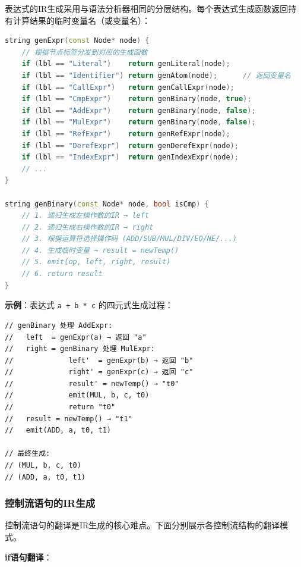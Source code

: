 \documentclass[12pt,a4paper]{ctexart}
\begin{document}
表达式的IR生成采用与语法分析器相同的分层结构。每个表达式生成函数返回持有计算结果的临时变量名（或变量名）：

\begin{lstlisting}[language=C++, caption={表达式IR生成函数}]
string genExpr(const Node* node) {
    // 根据节点标签分发到对应的生成函数
    if (lbl == "Literal")    return genLiteral(node);
    if (lbl == "Identifier") return genAtom(node);      // 返回变量名
    if (lbl == "CallExpr")   return genCallExpr(node);
    if (lbl == "CmpExpr")    return genBinary(node, true);
    if (lbl == "AddExpr")    return genBinary(node, false);
    if (lbl == "MulExpr")    return genBinary(node, false);
    if (lbl == "RefExpr")    return genRefExpr(node);
    if (lbl == "DerefExpr")  return genDerefExpr(node);
    if (lbl == "IndexExpr")  return genIndexExpr(node);
    // ...
}

string genBinary(const Node* node, bool isCmp) {
    // 1. 递归生成左操作数的IR → left
    // 2. 递归生成右操作数的IR → right
    // 3. 根据运算符选择操作码 (ADD/SUB/MUL/DIV/EQ/NE/...)
    // 4. 生成临时变量 → result = newTemp()
    // 5. emit(op, left, right, result)
    // 6. return result
}
\end{lstlisting}

\textbf{示例}：表达式 \texttt{a + b * c} 的四元式生成过程：

\begin{lstlisting}[language=IR, caption={a + b * c 的IR生成过程}]
// genBinary 处理 AddExpr:
//   left  = genExpr(a) → 返回 "a"
//   right = genBinary 处理 MulExpr:
//             left'  = genExpr(b) → 返回 "b"
//             right' = genExpr(c) → 返回 "c"
//             result' = newTemp() → "t0"
//             emit(MUL, b, c, t0)
//             return "t0"
//   result = newTemp() → "t1"
//   emit(ADD, a, t0, t1)

// 最终生成:
// (MUL, b, c, t0)
// (ADD, a, t0, t1)
\end{lstlisting}

\subsubsection{控制流语句的IR生成}

控制流语句的翻译是IR生成的核心难点。下面分别展示各控制流结构的翻译模式。

\textbf{if语句翻译}：
\end{document}
